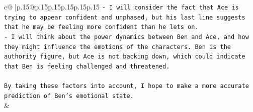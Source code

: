 \documentclass{article}
\begin{document}
{\begin{supertabular}{c@{$\;$}|p{.15\linewidth}@{}p{.15\linewidth}p{.15\linewidth}p{.15\linewidth}p{.15\linewidth}p{.15\linewidth}}
{{{\texttt{{-} I will consider the fact that Ace is trying to appear confident and unphased, but his last line suggests that he may be feeling more confident than he lets on.} \\
\texttt{{-} I will think about the power dynamics between Ben and Ace, and how they might influence the emotions of the characters. Ben is the authority figure, but Ace is not backing down, which could indicate that Ben is feeling challenged and threatened.} \\
\\ 
\texttt{By taking these factors into account, I hope to make a more accurate prediction of Ben's emotional state.} \\
            }
        }
    }
    & \\ \\

\end{supertabular}
}
\end{document}
